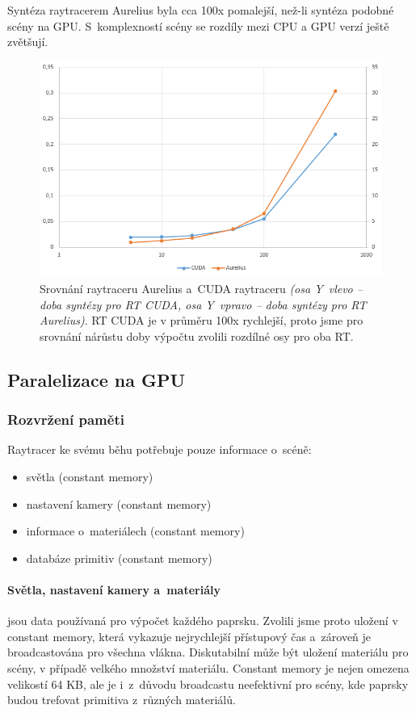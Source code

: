 \documentclass[12pt,a4paper,titlepage,final]{report}
\begin{document}
Syntéza raytracerem Aurelius byla cca 100x pomalejší, než-li syntéza podobné scény na GPU. S~komplexností scény se rozdíly mezi CPU a GPU verzí ještě zvětšují.


\begin{figure}
\begin{center}
\includegraphics[width=16cm]{images/srovnani.png}
\caption{Srovnání raytraceru Aurelius a~CUDA raytraceru \textit{(osa Y~vlevo -- doba syntézy pro RT CUDA, osa Y~vpravo -- doba syntézy pro RT Aurelius)}. RT CUDA je v průměru 100x rychlejší, proto jsme pro srovnání nárůstu doby výpočtu zvolili rozdílné osy pro oba RT.}
\end{center}
\end{figure}

\subsection{Paralelizace na GPU}

\subsubsection{Rozvržení paměti} 

Raytracer ke svému běhu potřebuje pouze informace o~scéně:
\begin{itemize}
	\item světla (constant memory)
	\item nastavení kamery (constant memory)
	\item informace o~materiálech (constant memory)
	\item databáze primitiv (constant memory)
\end{itemize}

\paragraph{Světla, nastavení kamery a~materiály} jsou data používaná pro výpočet každého paprsku. Zvolili jsme proto uložení v constant memory, která vykazuje nejrychlejší přístupový čas a~zároveň je broadcastována pro všechna vlákna. Diskutabilní může být uložení materiálu pro scény, v případě velkého množství materiálu. Constant memory je nejen omezena velikostí 64 KB, ale je i~z~důvodu broadcastu neefektivní pro scény, kde paprsky budou trefovat primitiva z~různých materiálů.
\end{document}
